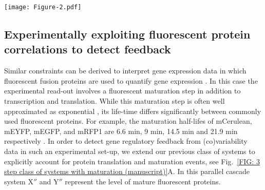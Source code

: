 \documentclass[%
 reprint,prx,
superscriptaddress,
%
%
%
%
%
%
%
%
%
 amsmath,amssymb,
 aps,
%
%
%
%
%
%
]{revtex4-2}
\begin{document}
\begin{figure*}[htb!]
\centering
\texttt{[image: Figure-2.pdf]}
\caption{ 
\textbf{Feedback in gene regulation affects the possible covariability of fluorescent protein measurements.}
A) 
As before X and Y correspond to co-regulated mRNA, but we now explicitly include the dynamics of immature fluorescent proteins denoted as X' and Y', as well as mature fluorescent proteins X'' and Y''. 
Because fluorescent proteins are typically stable and are thus effectively diluted with a common ``degradation'' time set by the cell-cycle, we focus on gene expression dynamics that is symmetric apart from the maturation step. The asymmetry between the co-regulated genes is then entirely characterized by the ratio of average fluorescent maturation times $T_\mathrm{m} := \tau_{\mathrm{mat},y} / \tau_{\mathrm{mat},x}$. B) Without feedback control (blue dots), fluorescence correlations are constrained to the region between the dashed and solid orange lines, the latter corresponding to the bound of Eq.~\eqref{EQ: two-step no-feedback constraint (manuscript)}.
%
Allowing for feedback (grey dots), the entire region becomes available. Correlations in fluorescence levels can thus be used to detect causal feedback in gene regulation from static population snapshots. {Dots are selected numerical simulations of specific fluorescent reporter systems within this class that illustrate the full accessibility of the region constrained by the analytically proven bounds.}}
\label{FIG: 3 step class of systems with maturation (manuscript)}
%
\end{figure*}
%

\vspace{-.5em}
\subsection{Experimentally exploiting fluorescent protein correlations to detect feedback}
\vspace{-.75em}
Similar constraints can be derived to interpret gene expression data in which fluorescent fusion proteins are used to quantify gene expression {\cite{Bar-Even2006}}. In this case the experimental read-out involves a fluorescent maturation step in addition to transcription and translation. While this maturation step is often well approximated as exponential \cite{Balleza2018}, its life-time differs significantly between commonly used fluorescent proteins. %
{For example, the maturation half-lifes of mCerulean, mEYFP, mEGFP, and mRFP1 are 6.6 min, 9 min, 14.5 min and 21.9 min respectively \cite{Balleza2018}}. 
In order to detect gene regulatory feedback from (co)variability data in such an experimental set-up, we extend our previous class of systems to explicitly account for protein translation and maturation events, see Fig.~\ref{FIG: 3 step class of systems with maturation (manuscript)}A. In this parallel cascade system X$''$ and Y$''$ represent the level of mature fluorescent proteins. 
\end{document}
